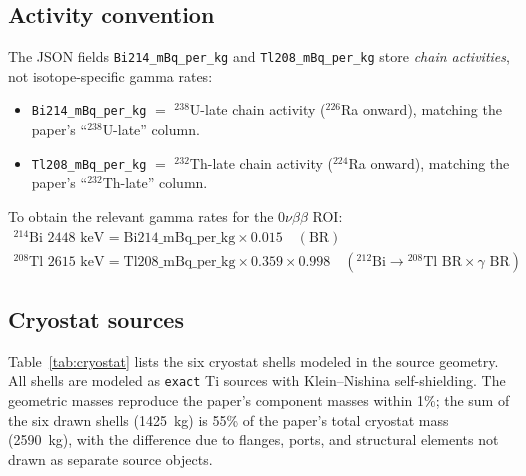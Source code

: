 \documentclass[11pt]{article}
\begin{document}
\subsection{Activity convention}

The JSON fields \texttt{Bi214\_mBq\_per\_kg} and
\texttt{Tl208\_mBq\_per\_kg} store \emph{chain activities}, not
isotope-specific gamma rates:

\begin{itemize}
\item \texttt{Bi214\_mBq\_per\_kg} $=$ $^{238}$U-late chain activity
  ($^{226}$Ra onward), matching the paper's ``$^{238}$U-late'' column.

\item \texttt{Tl208\_mBq\_per\_kg} $=$ $^{232}$Th-late chain activity
  ($^{224}$Ra onward), matching the paper's ``$^{232}$Th-late'' column.
\end{itemize}

To obtain the relevant gamma rates for the $0\nu\beta\beta$ ROI:
\begin{align}
  \text{$^{214}$Bi 2448~keV rate} &= \text{Bi214\_mBq\_per\_kg}
    \times 0.015 \quad (\text{BR}) \\
  \text{$^{208}$Tl 2615~keV rate} &= \text{Tl208\_mBq\_per\_kg}
    \times 0.359 \times 0.998 \quad
    (\text{$^{212}$Bi$\to$$^{208}$Tl BR} \times \text{$\gamma$ BR})
\end{align}

\subsection{Cryostat sources}

Table~\ref{tab:cryostat} lists the six cryostat shells modeled in the
source geometry.  All shells are modeled as \texttt{exact} Ti
sources with Klein--Nishina self-shielding.  The geometric masses
reproduce the paper's component masses within 1\%; the sum of the six
drawn shells (1425~kg) is 55\% of the paper's total cryostat mass
(2590~kg), with the difference due to flanges, ports, and structural
elements not drawn as separate source objects.
\end{document}
